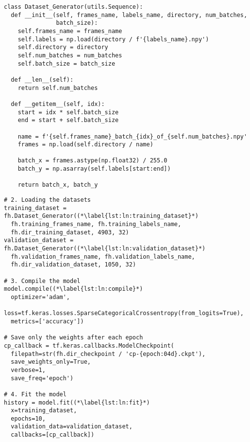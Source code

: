 \begin{lstlisting}[style=python, caption={\texttt{Dataset\_Generator} class}, label=lst:dataset_generator_class]
class Dataset_Generator(utils.Sequence):
  def __init__(self, frames_name, labels_name, directory, num_batches,
               batch_size):
    self.frames_name = frames_name
    self.labels = np.load(directory / f'{labels_name}.npy')
    self.directory = directory
    self.num_batches = num_batches
    self.batch_size = batch_size

  def __len__(self):
    return self.num_batches

  def __getitem__(self, idx):
    start = idx * self.batch_size
    end = start + self.batch_size

    name = f'{self.frames_name}_batch_{idx}_of_{self.num_batches}.npy'
    frames = np.load(self.directory / name)

    batch_x = frames.astype(np.float32) / 255.0
    batch_y = np.asarray(self.labels[start:end])

    return batch_x, batch_y
\end{lstlisting}

\begin{lstlisting}[style=python, caption={Training of the model}, label=lst:model_fitting]
# 2. Loading the datasets
training_dataset = fh.Dataset_Generator((*\label{lst:ln:training_dataset}*)
  fh.training_frames_name, fh.training_labels_name,
  fh.dir_training_dataset, 4903, 32)
validation_dataset = fh.Dataset_Generator((*\label{lst:ln:validation_dataset}*)
  fh.validation_frames_name, fh.validation_labels_name,
  fh.dir_validation_dataset, 1050, 32)

# 3. Compile the model
model.compile((*\label{lst:ln:compile}*)
  optimizer='adam',
  loss=tf.keras.losses.SparseCategoricalCrossentropy(from_logits=True),
  metrics=['accuracy'])

# Save only the weights after each epoch
cp_callback = tf.keras.callbacks.ModelCheckpoint(
  filepath=str(fh.dir_checkpoint / 'cp-{epoch:04d}.ckpt'),
  save_weights_only=True,
  verbose=1,
  save_freq='epoch')

# 4. Fit the model
history = model.fit((*\label{lst:ln:fit}*)
  x=training_dataset,
  epochs=10,
  validation_data=validation_dataset,
  callbacks=[cp_callback])
\end{lstlisting}

